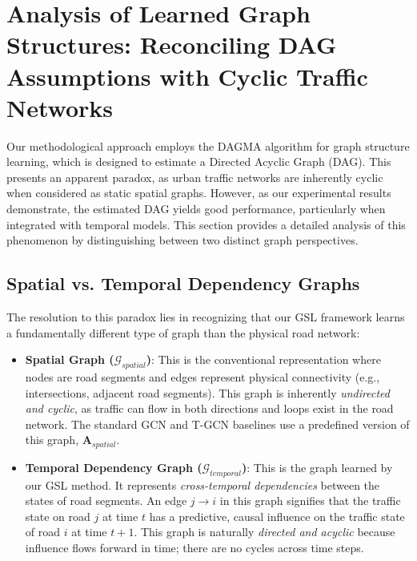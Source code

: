 \documentclass[pdflatex,sn-mathphys-num]{sn-jnl}%
\theoremstyle{thmstyleone}%
\theoremstyle{thmstyletwo}%
\theoremstyle{thmstylethree}%
\begin{document}

\section{Analysis of Learned Graph Structures: Reconciling DAG Assumptions with Cyclic Traffic Networks}\label{sec:acyclicity}

Our methodological approach employs the DAGMA algorithm \citep{Bello2024DAGMA} for graph structure learning, which is designed to estimate a Directed Acyclic Graph (DAG). This presents an apparent paradox, as urban traffic networks are inherently cyclic when considered as static spatial graphs. However, as our experimental results demonstrate, the estimated DAG yields good performance, particularly when integrated with temporal models. This section provides a detailed analysis of this phenomenon by distinguishing between two distinct graph perspectives.

\subsection{Spatial vs. Temporal Dependency Graphs}

The resolution to this paradox lies in recognizing that our GSL framework learns a fundamentally different type of graph than the physical road network:

\begin{itemize}
    \item \textbf{Spatial Graph ($\mathcal{G}_{spatial}$)}: This is the conventional representation where nodes are road segments and edges represent physical connectivity (e.g., intersections, adjacent road segments). This graph is inherently \textit{undirected and cyclic}, as traffic can flow in both directions and loops exist in the road network. The standard GCN and T-GCN baselines use a predefined version of this graph, $\mathbf{A}_{spatial}$.

    \item \textbf{Temporal Dependency Graph ($\mathcal{G}_{temporal}$)}: This is the graph learned by our GSL method. It represents \textit{cross-temporal dependencies} between the states of road segments. An edge $j \rightarrow i$ in this graph signifies that the traffic state on road $j$ at time $t$ has a predictive, causal influence on the traffic state of road $i$ at time $t+1$. This graph is naturally \textit{directed and acyclic} because influence flows forward in time; there are no cycles across time steps.
\end{itemize}
\end{document}
